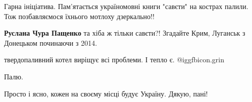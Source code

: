  
 
 
 
 

 
Гарна ініціатива. Пам'ятається україномовні книги "савєти" на кострах палили. Тож позбавляємося їхнього мотлоху дзеркально!!

 
\textbf{Руслана Чура Пащенко} та хіба ж тільки савєти?! Згадайте Крим, Луганськ з Донецьком починаючи з 2014.


 
твердопаливний котел виріщує всі проблеми. І тепло є.  @igg{fbicon.grin} 

 
Палю.

 
Просто і ясно, кожен на своєму місці будує Україну. Дякую, пані!

